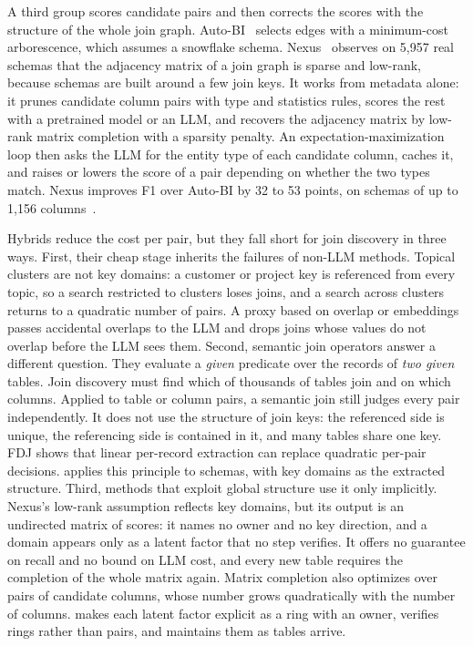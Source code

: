  A third group scores candidate pairs and then corrects the scores with the structure of the whole join graph.
Auto-BI~\cite{AutoBI} selects edges with a minimum-cost arborescence, which assumes a snowflake schema.
Nexus~\cite{Nexus} observes on 5,957 real schemas that the adjacency matrix of a join graph is sparse and low-rank, because schemas are built around a few join keys.
It works from metadata alone: it prunes candidate column pairs with type and statistics rules, scores the rest with a pretrained model or an LLM, and recovers the adjacency matrix by low-rank matrix completion with a sparsity penalty.
An expectation-maximization loop then asks the LLM for the entity type of each candidate column, caches it, and raises or lowers the score of a pair depending on whether the two types match.
Nexus improves F1 over Auto-BI by 32 to 53 points, on schemas of up to 1,156 columns~\cite{Nexus}.

 Hybrids reduce the cost per pair, but they fall short for join discovery in three ways.
First, their cheap stage inherits the failures of non-LLM methods.
Topical clusters are not key domains: a customer or project key is referenced from every topic, so a search restricted to clusters loses joins, and a search across clusters returns to a quadratic number of pairs.
A proxy based on overlap or embeddings passes accidental overlaps to the LLM and drops joins whose values do not overlap before the LLM sees them.
Second, semantic join operators answer a different question.
They evaluate a \emph{given} predicate over the records of \emph{two given} tables.
Join discovery must find which of thousands of tables join and on which columns.
Applied to table or column pairs, a semantic join still judges every pair independently.
It does not use the structure of join keys: the referenced side is unique, the referencing side is contained in it, and many tables share one key.
FDJ shows that linear per-record extraction can replace quadratic per-pair decisions.
\ourmethod applies this principle to schemas, with key domains as the extracted structure.
Third, methods that exploit global structure use it only implicitly.
Nexus's low-rank assumption reflects key domains, but its output is an undirected matrix of scores: it names no owner and no key direction, and a domain appears only as a latent factor that no step verifies.
It offers no guarantee on recall and no bound on LLM cost, and every new table requires the completion of the whole matrix again.
Matrix completion also optimizes over pairs of candidate columns, whose number grows quadratically with the number of columns.
\ourmethod makes each latent factor explicit as a ring with an owner, verifies rings rather than pairs, and maintains them as tables arrive.

